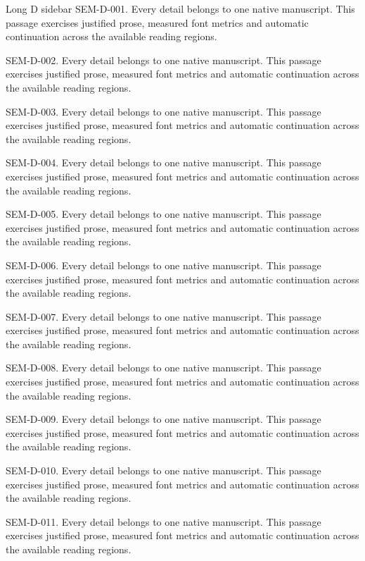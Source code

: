 \begin{m20sidebarwide}[columns=2,id=long-wide2]{Long D sidebar}
SEM-D-001. Every detail belongs to one native manuscript. This passage exercises justified prose, measured font metrics and automatic continuation across the available reading regions.\par
SEM-D-002. Every detail belongs to one native manuscript. This passage exercises justified prose, measured font metrics and automatic continuation across the available reading regions.\par
SEM-D-003. Every detail belongs to one native manuscript. This passage exercises justified prose, measured font metrics and automatic continuation across the available reading regions.\par
SEM-D-004. Every detail belongs to one native manuscript. This passage exercises justified prose, measured font metrics and automatic continuation across the available reading regions.\par
SEM-D-005. Every detail belongs to one native manuscript. This passage exercises justified prose, measured font metrics and automatic continuation across the available reading regions.\par
SEM-D-006. Every detail belongs to one native manuscript. This passage exercises justified prose, measured font metrics and automatic continuation across the available reading regions.\par
SEM-D-007. Every detail belongs to one native manuscript. This passage exercises justified prose, measured font metrics and automatic continuation across the available reading regions.\par
SEM-D-008. Every detail belongs to one native manuscript. This passage exercises justified prose, measured font metrics and automatic continuation across the available reading regions.\par
SEM-D-009. Every detail belongs to one native manuscript. This passage exercises justified prose, measured font metrics and automatic continuation across the available reading regions.\par
SEM-D-010. Every detail belongs to one native manuscript. This passage exercises justified prose, measured font metrics and automatic continuation across the available reading regions.\par
SEM-D-011. Every detail belongs to one native manuscript. This passage exercises justified prose, measured font metrics and automatic continuation across the available reading regions.\par

\end{m20sidebarwide}
